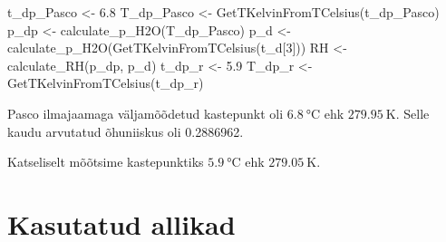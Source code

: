 \documentclass[
  12pt,
  a4paper,
  onecolumn, twoside]{article}
\newenvironment{Shaded}{\begin{snugshade}}{\end{snugshade}}
\newcommand{\DecValTok}[1]{\textcolor[rgb]{0.00,0.00,0.81}{#1}}
\newcommand{\FloatTok}[1]{\textcolor[rgb]{0.00,0.00,0.81}{#1}}
\newcommand{\FunctionTok}[1]{\textcolor[rgb]{0.00,0.00,0.00}{#1}}
\newcommand{\NormalTok}[1]{#1}
\newcommand{\OtherTok}[1]{\textcolor[rgb]{0.56,0.35,0.01}{#1}}
\begin{document}
\begin{Shaded}
\begin{Highlighting}[numbers=left,,]
\NormalTok{t\_dp\_Pasco }\OtherTok{\textless{}{-}} \FloatTok{6.8}
\NormalTok{T\_dp\_Pasco }\OtherTok{\textless{}{-}} \FunctionTok{GetTKelvinFromTCelsius}\NormalTok{(t\_dp\_Pasco)}
\NormalTok{p\_dp }\OtherTok{\textless{}{-}} \FunctionTok{calculate\_p\_H2O}\NormalTok{(T\_dp\_Pasco)}
\NormalTok{p\_d }\OtherTok{\textless{}{-}} \FunctionTok{calculate\_p\_H2O}\NormalTok{(}\FunctionTok{GetTKelvinFromTCelsius}\NormalTok{(t\_d[}\DecValTok{3}\NormalTok{]))}
\NormalTok{RH }\OtherTok{\textless{}{-}} \FunctionTok{calculate\_RH}\NormalTok{(p\_dp, p\_d)}
\NormalTok{t\_dp\_r }\OtherTok{\textless{}{-}} \FloatTok{5.9}
\NormalTok{T\_dp\_r }\OtherTok{\textless{}{-}} \FunctionTok{GetTKelvinFromTCelsius}\NormalTok{(t\_dp\_r)}
\end{Highlighting}
\end{Shaded}

Pasco ilmajaamaga väljamõõdetud kastepunkt oli \(\qty{6.8}{\degreeCelsius}\) ehk \(\qty{279.95}{\kelvin}\). Selle kaudu arvutatud õhuniiskus oli 0.2886962.

Katseliselt mõõtsime kastepunktiks \(\qty{5.9}{\degreeCelsius}\) ehk \(\qty{279.05}{\kelvin}\).

\onecolumn

\hypertarget{kasutatud-allikad}{%
\section*{Kasutatud allikad}\label{kasutatud-allikad}}



\noindent

\setlength{\parindent}{-0.20in}
\end{document}
